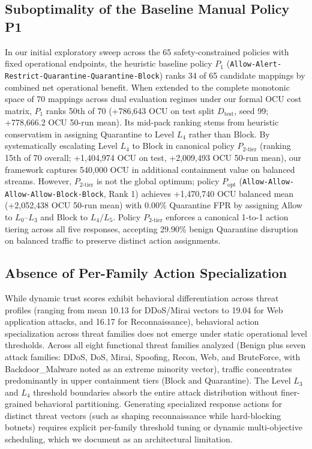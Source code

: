 \documentclass[journal,10pt,onecolumn]{IEEEtran}
\begin{document}
\subsection{Suboptimality of the Baseline Manual Policy P1}
In our initial exploratory sweep across the 65 safety-constrained policies with fixed operational endpoints, the heuristic baseline policy $P_1$ (\texttt{Allow-Alert-Restrict-Quarantine-Quarantine-Block}) ranks 34 of 65 candidate mappings by combined net operational benefit. When extended to the complete monotonic space of 70 mappings across dual evaluation regimes under our formal OCU cost matrix, $P_1$ ranks 50th of 70 (+786,643 OCU on test split $D_{\text{test}}$, seed 99; +778,666.2 OCU 50-run mean). Its mid-pack ranking stems from heuristic conservatism in assigning Quarantine to Level $L_4$ rather than Block. By systematically escalating Level $L_4$ to Block in canonical policy $P_{2\text{-tier}}$ (ranking 15th of 70 overall; +1,404,974 OCU on test, +2,009,493 OCU 50-run mean), our framework captures 540,000 OCU in additional containment value on balanced streams. However, $P_{2\text{-tier}}$ is not the global optimum; policy $P_{\text{opt}}$ (\texttt{Allow-Allow-Allow-Allow-Block-Block}, Rank 1) achieves +1,470,740 OCU balanced mean (+2,052,438 OCU 50-run mean) with 0.00\% Quarantine FPR by assigning Allow to $L_0$--$L_3$ and Block to $L_4/L_5$. Policy $P_{2\text{-tier}}$ enforces a canonical 1-to-1 action tiering across all five responses, accepting 29.90\% benign Quarantine disruption on balanced traffic to preserve distinct action assignments.

\subsection{Absence of Per-Family Action Specialization}
While dynamic trust scores exhibit behavioral differentiation across threat profiles (ranging from mean 10.13 for DDoS/Mirai vectors to 19.04 for Web application attacks, and 16.17 for Reconnaissance), behavioral action specialization across threat families does not emerge under static operational level thresholds. Across all eight functional threat families analyzed (Benign plus seven attack families: DDoS, DoS, Mirai, Spoofing, Recon, Web, and BruteForce, with Backdoor\_Malware noted as an extreme minority vector), traffic concentrates predominantly in upper containment tiers (Block and Quarantine). The Level $L_3$ and $L_4$ threshold boundaries absorb the entire attack distribution without finer-grained behavioral partitioning. Generating specialized response actions for distinct threat vectors (such as shaping reconnaissance while hard-blocking botnets) requires explicit per-family threshold tuning or dynamic multi-objective scheduling, which we document as an architectural limitation.
\end{document}
